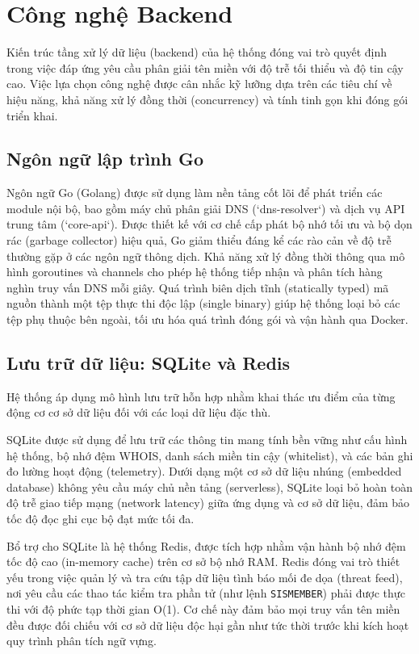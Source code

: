 \section{Công nghệ Backend}

Kiến trúc tầng xử lý dữ liệu (backend) của hệ thống đóng vai trò quyết định trong việc đáp ứng yêu cầu phân giải tên miền với độ trễ tối thiểu và độ tin cậy cao. Việc lựa chọn công nghệ được cân nhắc kỹ lưỡng dựa trên các tiêu chí về hiệu năng, khả năng xử lý đồng thời (concurrency) và tính tinh gọn khi đóng gói triển khai.

\subsection{Ngôn ngữ lập trình Go}
Ngôn ngữ Go (Golang) được sử dụng làm nền tảng cốt lõi để phát triển các module nội bộ, bao gồm máy chủ phân giải DNS (`dns-resolver`) và dịch vụ API trung tâm (`core-api`). Được thiết kế với cơ chế cấp phát bộ nhớ tối ưu và bộ dọn rác (garbage collector) hiệu quả, Go giảm thiểu đáng kể các rào cản về độ trễ thường gặp ở các ngôn ngữ thông dịch. Khả năng xử lý đồng thời thông qua mô hình goroutines và channels cho phép hệ thống tiếp nhận và phân tích hàng nghìn truy vấn DNS mỗi giây. Quá trình biên dịch tĩnh (statically typed) mã nguồn thành một tệp thực thi độc lập (single binary) giúp hệ thống loại bỏ các tệp phụ thuộc bên ngoài, tối ưu hóa quá trình đóng gói và vận hành qua Docker.

\subsection{Lưu trữ dữ liệu: SQLite và Redis}
Hệ thống áp dụng mô hình lưu trữ hỗn hợp nhằm khai thác ưu điểm của từng động cơ cơ sở dữ liệu đối với các loại dữ liệu đặc thù. 

SQLite được sử dụng để lưu trữ các thông tin mang tính bền vững như cấu hình hệ thống, bộ nhớ đệm WHOIS, danh sách miền tin cậy (whitel\-ist), và các bản ghi đo lường hoạt động (telemetry). Dưới dạng một cơ sở dữ liệu nhúng (embedded database) không yêu cầu máy chủ nền tảng (serverless), SQLite loại bỏ hoàn toàn độ trễ giao tiếp mạng (network latency) giữa ứng dụng và cơ sở dữ liệu, đảm bảo tốc độ đọc ghi cục bộ đạt mức tối đa.

Bổ trợ cho SQLite là hệ thống Redis, được tích hợp nhằm vận hành bộ nhớ đệm tốc độ cao (in-memory cache) trên cơ sở bộ nhớ RAM. Redis đóng vai trò thiết yếu trong việc quản lý và tra cứu tập dữ liệu tình báo mối đe dọa (threat feed), nơi yêu cầu các thao tác kiểm tra phần tử (như lệnh \texttt{SISMEMBER}) phải được thực thi với độ phức tạp thời gian O(1). Cơ chế này đảm bảo mọi truy vấn tên miền đều được đối chiếu với cơ sở dữ liệu độc hại gần như tức thời trước khi kích hoạt quy trình phân tích ngữ vựng.

